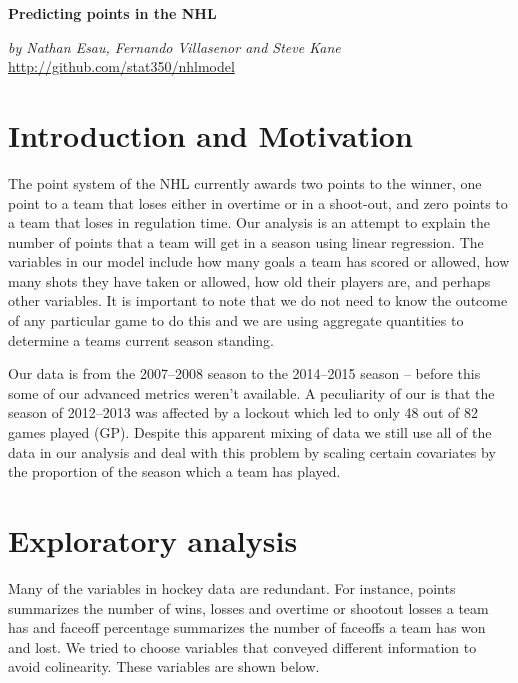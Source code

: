 \documentclass[12pt]{article}
\begin{document}


\thispagestyle{firststyle}

{\Large \noindent\textbf{Predicting points in the NHL}}

\medskip
\noindent \textsl{by Nathan Esau, Fernando Villasenor and Steve Kane} \hfill {\footnotesize\url{http://github.com/stat350/nhlmodel}}

\section{Introduction and Motivation}

The point system of the NHL currently awards two points to the winner, one point to a team that loses either in overtime or in a shoot-out, and zero points to a team that loses in regulation time. Our analysis is an attempt to explain the number of points that a team will get in a season using linear regression. The variables in our model include how many goals a team has scored or allowed, how many shots they have taken or allowed, how old their players are, and perhaps other variables. It is important to note that we do not need to know the outcome of any particular game to do this and we are using aggregate quantities to determine a teams current season standing.

Our data is from the 2007--2008 season to the 2014--2015 season -- before this some of our advanced metrics weren't available. A peculiarity of our is that the season of 2012--2013 was affected by a lockout which led to only 48 out of 82 games played (GP). Despite this apparent mixing of data we still use all of the data in our analysis and deal with this problem by scaling certain covariates by the proportion of the season which a team has played.

\section{Exploratory analysis}

Many of the variables in hockey data are redundant. For instance, points summarizes the number of wins, losses and overtime or shootout losses a team has and faceoff percentage summarizes the number of faceoffs a team has won and lost. We tried to choose variables that conveyed different information to avoid colinearity. These variables are shown below.
\end{document}
